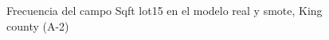 \begin{figure}[H]
    \centering
    
    \caption{Frecuencia del campo Sqft lot15 en el modelo real y smote, King county (A-2)}
    \label{frecuency-smote-sqft lot15}
\end{figure}